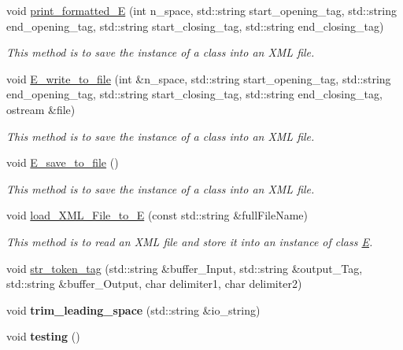 \begin{DoxyCompactItemize}
\item 
void \hyperlink{classE_aa86e2cf9dfc994f030b68adc37e90cba}{print\+\_\+formatted\+\_\+E} (int n\+\_\+space, std\+::string start\+\_\+opening\+\_\+tag, std\+::string end\+\_\+opening\+\_\+tag, std\+::string start\+\_\+closing\+\_\+tag, std\+::string end\+\_\+closing\+\_\+tag)
\begin{DoxyCompactList}\small\item\em This method is to save the instance of a class into an X\+ML file. \end{DoxyCompactList}\item 
void \hyperlink{classE_a614e248eb98abd5c0cf1379e5e68ab8a}{E\+\_\+write\+\_\+to\+\_\+file} (int \&n\+\_\+space, std\+::string start\+\_\+opening\+\_\+tag, std\+::string end\+\_\+opening\+\_\+tag, std\+::string start\+\_\+closing\+\_\+tag, std\+::string end\+\_\+closing\+\_\+tag, ostream \&file)
\begin{DoxyCompactList}\small\item\em This method is to save the instance of a class into an X\+ML file. \end{DoxyCompactList}\item 
void \hyperlink{classE_a54b982626cbfeec459b8f7192b705bfb}{E\+\_\+save\+\_\+to\+\_\+file} ()
\begin{DoxyCompactList}\small\item\em This method is to save the instance of a class into an X\+ML file. \end{DoxyCompactList}\item 
void \hyperlink{classE_adaf02759b557593d3f88129bff23df7a}{load\+\_\+\+X\+M\+L\+\_\+\+File\+\_\+to\+\_\+E} (const std\+::string \&full\+File\+Name)
\begin{DoxyCompactList}\small\item\em This method is to read an X\+ML file and store it into an instance of class \hyperlink{classE}{E}. \end{DoxyCompactList}\item 
void \hyperlink{classE_a47d1056c3a733c2a1c17c8a1fcd01ddd}{str\+\_\+token\+\_\+tag} (std\+::string \&buffer\+\_\+\+Input, std\+::string \&output\+\_\+\+Tag, std\+::string \&buffer\+\_\+\+Output, char delimiter1, char delimiter2)
\item 
void {\bfseries trim\+\_\+leading\+\_\+space} (std\+::string \&io\+\_\+string)\hypertarget{classE_aad28d8d46effb1781840b38f6e20d76a}{}\label{classE_aad28d8d46effb1781840b38f6e20d76a}

\item 
void {\bfseries testing} ()\hypertarget{classE_a9ddbf0e07f103f81f722752d6f2a5980}{}\label{classE_a9ddbf0e07f103f81f722752d6f2a5980}


\end{DoxyCompactItemize}

